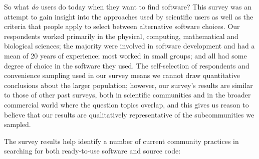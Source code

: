 \documentclass{casicswhitepaper}
\begin{document}
%
%

So what \emph{do} users do today when they want to find software?  This survey was an attempt to gain insight into the approaches used by scientific users as well as the criteria that people apply to select between alternative software choices.  Our respondents worked primarily in the physical, computing, mathematical and biological sciences; the majority were involved in software development and had a mean of 20 years of experience; most worked in small groups; and all had some degree of choice in the software they used.  The self-selection of respondents and convenience sampling used in our survey means we cannot draw quantitative conclusions about the larger population; however, our survey's results are similar to those of other past surveys, both in scientific communities and in the broader commercial world where the question topics overlap, and this gives us reason to believe that our results are qualitatively representative of the subcommunities we sampled.

The survey results help identify a number of current community practices in searching for both ready-to-use software and source code:
\end{document}
